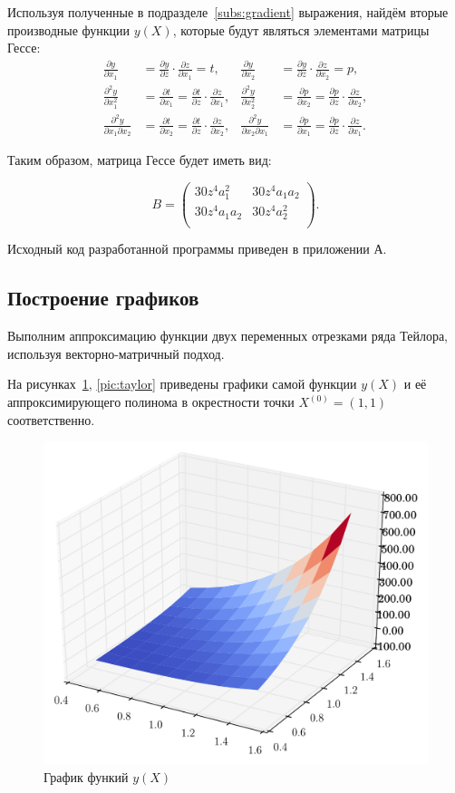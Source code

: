 Используя полученные в подразделе~\ref{subs:gradient} выражения, найдём вторые производные
функции $y(X)$, которые будут являться элементами матрицы Гессе:
\begin{align*}
  \frac{\partial y}{\partial x_1} &= \frac{\partial y}{\partial z} \cdot \frac{\partial z}{\partial x_1} = t,
  &\frac{\partial y}{\partial x_2}& = \frac{\partial y}{\partial z} \cdot \frac{\partial z}{\partial x_2} = p, \\
  \frac{\partial^2 y}{\partial x_1^2} &= \frac{\partial t}{\partial x_1} = \frac{\partial t}{\partial z} \cdot \frac{\partial z}{\partial x_1},
  &\frac{\partial^2 y} {\partial x_2^2}& = \frac{\partial p}{\partial x_2} =  \frac{\partial p}{\partial z} \cdot \frac{\partial z}{\partial x_2}, \\ 
  \frac{\partial^2 y}{\partial x_1 \partial x_2} &= \frac{\partial t}{\partial x_2} = \frac{\partial t}{\partial z} \cdot \frac{\partial z}{\partial x_2},
  &\frac{\partial^2 y}{\partial x_2 \partial x_1} &= \frac{\partial p}{\partial x_1} = \frac{\partial p}{\partial z} \cdot \frac{\partial z}{\partial x_1}.
\end{align*}

Таким образом, матрица Гессе будет иметь вид:

\[
  B =
    \left(
      \begin{array}{cc}
        30 z^4 a_1^2 & 30 z^4 a_1 a_2 \\
        30 z^4 a_1 a_2 & 30 z^4 a_2^2 \\
      \end{array}
    \right)
  .
\]

Исходный код разработанной программы приведен в приложении А.


\subsection{Построение графиков}
Выполним аппроксимацию функции двух переменных отрезками ряда Тейлора, используя
векторно-матричный подход.

\newpage

На рисунках~\ref{pic:real}, \ref{pic:taylor} приведены
графики самой функции $y(X)$ и её аппроксимирующего полинома в
окрестности точки $X^{(0)} = (1, 1)$ соответственно.

\begin{figure}[h!]
  \centering
  \includegraphics[width=0.65\linewidth]{pic/real_2}
  \caption{График функий $y(X)$}
  \label{pic:real}
\end{figure}

